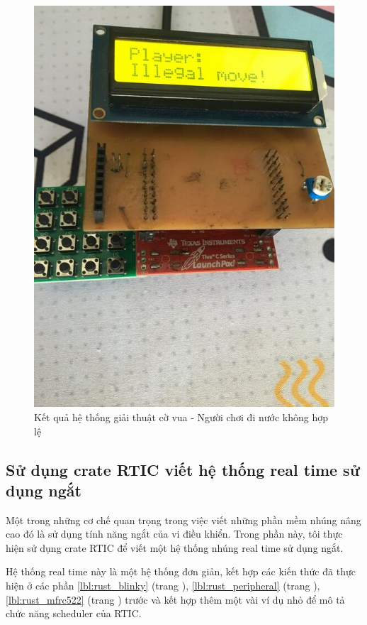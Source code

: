 \begin{figure}[ht]
\centering
\includegraphics[scale=0.4]{images/chess_illegal.jpg}
\caption{Kết quả hệ thống giải thuật cờ vua - Người chơi đi nước không hợp lệ}
\label{fig:chess_illegal}
\end{figure}

\clearpage
\subsection{Sử dụng crate RTIC viết hệ thống real time sử dụng ngắt}
Một trong những cơ chế quan trọng trong việc viết những phần mềm nhúng nâng cao đó là sử dụng tính năng ngắt của vi điều khiển.
Trong phần này, tôi thực hiện sử dụng crate RTIC \cite{rtic_website} để viết một hệ thống nhúng real time sử dụng ngắt.

Hệ thống real time này là một hệ thống đơn giản, kết hợp các kiến thức đã thực hiện ở các phần \ref{lbl:rust_blinky} (trang \pageref{lbl:rust_blinky}), \ref{lbl:rust_peripheral} (trang \pageref{lbl:rust_peripheral}), \ref{lbl:rust_mfrc522} (trang \pageref{lbl:rust_mfrc522}) trước và kết hợp thêm một vài ví dụ nhỏ để mô tả chức năng scheduler của RTIC.

